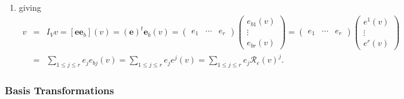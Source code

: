 \documentclass[aps,preprint]{revtex4}
\begin{document}
\begin{enumerate}
\begin{enumerate}
\item giving%
\begin{eqnarray}
v &=&I_{V}v=\left[ \boldsymbol{ee}_{b}\right] \left( v\right) =\left( 
\boldsymbol{e}\right) ^{t}\boldsymbol{e}_{b}\left( v\right) =\left( 
\begin{array}{ccc}
e_{1} & \cdots & e_{r}%
\end{array}%
\right) \left( 
\begin{array}{c}
e_{b1}\left( v\right) \\ 
\vdots \\ 
e_{br}\left( v\right)%
\end{array}%
\right) =\left( 
\begin{array}{ccc}
e_{1} & \cdots & e_{r}%
\end{array}%
\right) \left( 
\begin{array}{c}
e^{1}\left( v\right) \\ 
\vdots \\ 
e^{r}\left( v\right)%
\end{array}%
\right) \\
&=&\sum_{1\leq j\leq r}e_{j}e_{bj}\left( v\right) =\sum_{1\leq j\leq
r}e_{j}e^{j}\left( v\right) =\sum_{1\leq j\leq r}e_{j}\mathcal{R}_{e}\left(
v\right) ^{j}.
\end{eqnarray}
\end{enumerate}
\end{enumerate}

\subsubsection{Basis Transformations \label{Basis Transformations}}
\end{document}
